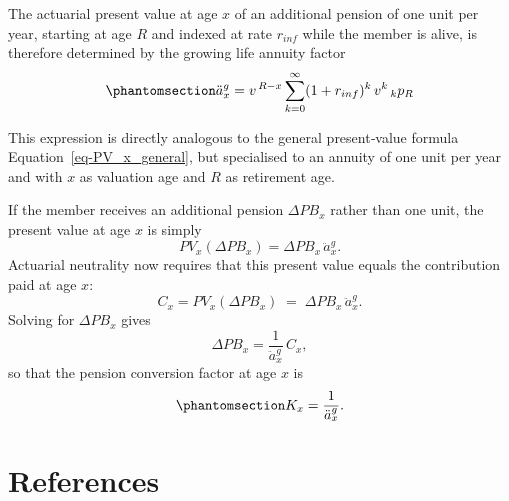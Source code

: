 \documentclass[
  letterpaper,
  DIV=11,
  numbers=noendperiod]{scrreprt}
\begin{document}
The actuarial present value at age \(x\) of an additional pension of one
unit per year, starting at age \(R\) and indexed at rate \(r_{inf}\)
while the member is alive, is therefore determined by the growing life
annuity factor
\begin{equation}\protect\phantomsection\label{eq-growingLifeAnnuity}{
    \ddot{a}_x^{g} = v^{\,R - x} \sum_{k=0}^{\infty} (1 + r_{inf})^{k} \, v^{k} \, {}_k p_R
}\end{equation}

This expression is directly analogous to the general present‑value
formula Equation~\ref{eq-PV_x_general}, but specialised to an annuity of
one unit per year and with \(x\) as valuation age and \(R\) as
retirement age.

If the member receives an additional pension \(\Delta PB_x\) rather than
one unit, the present value at age \(x\) is simply \[
    PV_x(\Delta PB_x) = \Delta PB_x \, \ddot{a}_x^{g}.
\] Actuarial neutrality now requires that this present value equals the
contribution paid at age \(x\): \[
    C_x = PV_x(\Delta PB_x) \;=\; \Delta PB_x \, \ddot{a}_x^{g}.
\] Solving for \(\Delta PB_x\) gives \[
    \Delta PB_x = \frac{1}{\ddot{a}_x^{g}} \, C_x,
\] so that the pension conversion factor at age \(x\) is
\begin{equation}\protect\phantomsection\label{eq-Kx_def_basic}{
    K_x = \frac{1}{\ddot{a}_x^{g}}.
}\end{equation}


\chapter*{References}\label{references}

\end{document}
